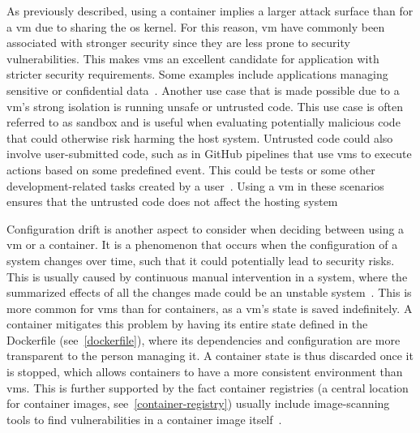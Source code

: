 \documentclass{kththesis}
\begin{document}
As previously described, using a container implies a larger attack surface than for a \Gls{vm} due to sharing the \Gls{os} kernel. For this reason, \Gls{vm} have commonly been associated with stronger security since they are less prone to security vulnerabilities. This makes \Glspl{vm} an excellent candidate for application with stricter security requirements. Some examples include applications managing sensitive or confidential data\ \cite{container-vm-decision-redhat}. Another use case that is made possible due to a \Gls{vm}'s strong isolation is running unsafe or untrusted code. This use case is often referred to as sandbox and is useful when evaluating potentially malicious code that could otherwise risk harming the host system. Untrusted code could also involve user-submitted code, such as in GitHub pipelines that use \Glspl{vm} to execute actions based on some predefined event. This could be tests or some other development-related tasks created by a user\ \cite{gh-selfhost-runner-sec}. Using a \Gls{vm} in these scenarios ensures that the untrusted code does not affect the hosting system\ \cite{vm-decision-kong, sandboxing}

Configuration drift is another aspect to consider when deciding between using a \Gls{vm} or a container. It is a phenomenon that occurs when the configuration of a system changes over time, such that it could potentially lead to security risks. This is usually caused by continuous manual intervention in a system, where the summarized effects of all the changes made could be an unstable system\ \cite{configuration-drift-tripwire, configuration-drift-wiz}. This is more common for \Glspl{vm} than for containers, as a \Gls{vm}'s state is saved indefinitely. A container mitigates this problem by having its entire state defined in the Dockerfile (see\ \ref{dockerfile}), where its dependencies and configuration are more transparent to the person managing it. A container state is thus discarded once it is stopped, which allows containers to have a more consistent environment than \Glspl{vm}. This is further supported by the fact container registries (a central location for container images, see\ \ref{container-registry}) usually include image-scanning tools to find vulnerabilities in a container image itself\ \cite{container-vm-decision}. 
\end{document}
